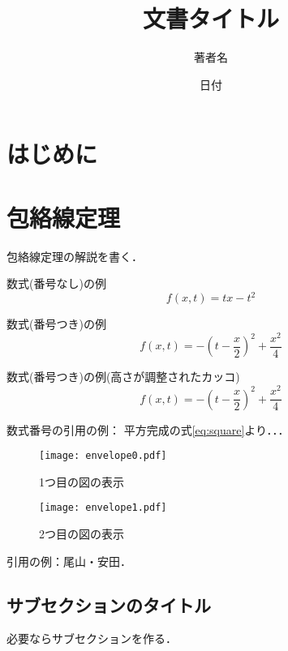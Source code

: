 \documentclass[11pt,a4j,fleqn]{jarticle}
\title{文書タイトル}
\author{著者名}
\date{日付}
\begin{document}
\maketitle

\section{はじめに}



\section{包絡線定理}

包絡線定理の解説を書く．

数式(番号なし)の例
\[
f(x, t) = t x - t^2
\]


数式(番号つき)の例
\begin{equation}
f(x, t)  = -(t - \frac{x}{2})^2 + \frac{x^2}{4} \label{eq:square}
\end{equation}

数式(番号つき)の例(高さが調整されたカッコ)
\begin{equation}
f(x, t) = -\left(t - \frac{x}{2}\right)^2 + \frac{x^2}{4} \label{eq:square-2}
\end{equation}



数式番号の引用の例：
平方完成の式\eqref{eq:square}より．．．

\begin{figure}
\begin{center}
\texttt{[image: envelope0.pdf]}
\end{center}
\caption{1つ目の図の表示}
\label{fig:1}
\end{figure}

\begin{figure}
\begin{center}
\texttt{[image: envelope1.pdf]}
\end{center}
\caption{2つ目の図の表示}
\label{fig:2}
\end{figure}



引用の例：尾山・安田\cite{OyamaYasuda11}．


\subsection{サブセクションのタイトル}

必要ならサブセクションを作る．
\end{document}
